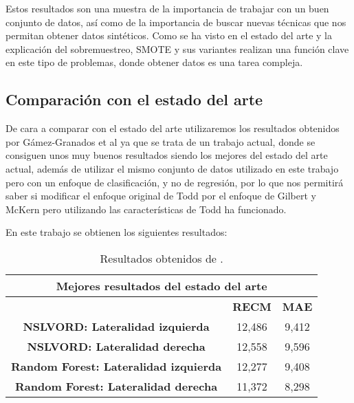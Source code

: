 Estos resultados son una muestra de la importancia de trabajar con un buen conjunto de datos, así como de la importancia de buscar nuevas técnicas que nos permitan obtener datos sintéticos. Como se ha visto en el estado del arte y la explicación del sobremuestreo, SMOTE y sus variantes realizan una función clave en este tipo de problemas, donde obtener datos es una tarea compleja.

\subsection{Comparación con el estado del arte}

De cara a comparar con el estado del arte utilizaremos los resultados obtenidos por Gámez-Granados et al \cite{NSLVOrdAge} ya que se trata de un trabajo actual, donde se consiguen unos muy buenos resultados siendo los mejores del estado del arte actual, además de utilizar el mismo conjunto de datos utilizado en este trabajo pero con un enfoque de clasificación, y no de regresión, por lo que nos permitirá saber si modificar el enfoque original de Todd por el enfoque de Gilbert y McKern pero utilizando las características de Todd ha funcionado.

En este trabajo se obtienen los siguientes resultados:

\begin{table}[H]
\centering
\begin{tabular}{|c|c|c|}
\hline
\multicolumn{3}{|c|}{\textbf{Mejores resultados del estado del arte}}        \\ \hline
\textbf{}                                     & \textbf{RECM} & \textbf{MAE} \\ \hline
\textbf{NSLVORD: Lateralidad izquierda}       & 12,486        & 9,412        \\ \hline
\textbf{NSLVORD: Lateralidad derecha}         & 12,558        & 9,596        \\ \hline
\textbf{Random Forest: Lateralidad izquierda} & 12,277        & 9,408        \\ \hline
\textbf{Random Forest: Lateralidad derecha}   & 11,372        & 8,298        \\ \hline
\end{tabular}%
\caption{Resultados obtenidos de \cite{NSLVOrdAge}.}\label{table:resultados_estado_arte}
\end{table}

